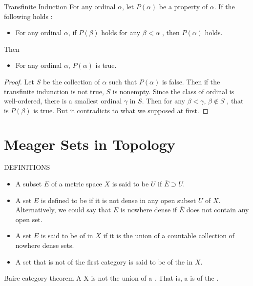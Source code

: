 \documentclass[../main.tex]{subfiles}
\begin{document}
\begin{theorem}{Transfinite Induction}{}
     For any ordinal \(  \alpha   \), let \(  P\left( \alpha  \right)   \) be a property of \(  \alpha   \). If the following holds : 
    \begin{itemize}
        \item For any ordinal \(  \alpha   \), if \(  P\left( \beta  \right)   \) holds for any \(  \beta < \alpha   \) , then \(  P\left( \alpha  \right)   \) holds.    
    \end{itemize}
       Then \begin{itemize}
        \item For any ordinal \(  \alpha   \), \(  P\left( \alpha  \right)   \) is true.  
       \end{itemize}
       
\end{theorem}

\begin{proof}
    Let \(  S  \) be the collection of \(  \alpha   \) such that \(  P\left( \alpha  \right)   \) is false. Then if the transfinite indunction is not true, \(  S  \) is nonempty. Since the class of ordinal is well-ordered, there is a smallest ordinal \(   \gamma   \) in \(  S  \). Then for any \(  \beta <  \gamma   \), \(  \beta \not \in S  \) , that is \(  P\left( \beta  \right)   \) is true.   But it contradicts to what we supposed at first.      
\end{proof}

\section{Meager Sets in Topology}
\begin{definition}{DEFINITIONS}{}
\begin{itemize}
    \item A subset $E$ of a metric space $X$ is said to be  $U$ if $\overline{E} \supset U$.
    \item  A set $E$ is defined to be  if it is not dense in any open subset $U$ of $X$. Alternatively, we could say that $E$ is nowhere dense if $\overline{E}$ does not contain any open set.
    \item A set $E$ is said to be of  in $X$ if it is the union of a countable collection of nowhere dense sets. 
    \item  A set that is not of the first category is said to be of the  in $X$.
\end{itemize}

\end{definition}

\begin{theorem}{Baire category theorem}{}
A  X is not the union of a . That is, a  is of the .
\end{theorem}
\end{document}
